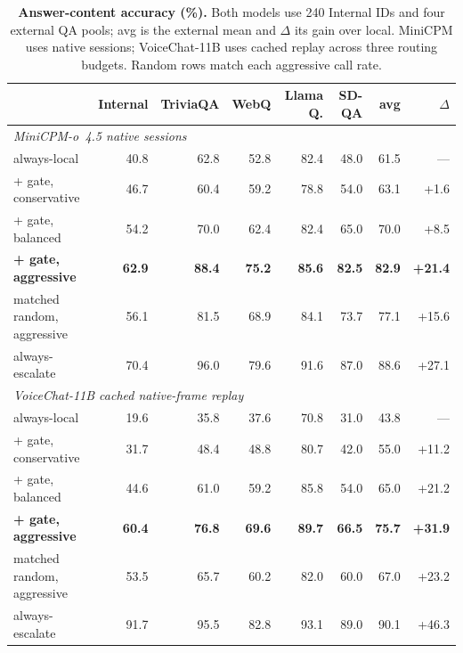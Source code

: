 \begin{table}[t]
\centering\small
\setlength{\tabcolsep}{3pt}
\renewcommand{\arraystretch}{0.98}
\caption{\textbf{Answer-content accuracy (\%).}
Both models use 240 Internal IDs and four external QA pools; avg is the
external mean and $\Delta$ its gain over local. MiniCPM uses native sessions;
VoiceChat-11B uses cached replay across three routing budgets. Random rows
match each aggressive call rate.}
\label{tab:transfer}
\begin{tabular*}{\linewidth}{@{\extracolsep{\fill}}lrrrrrrr@{}}
\toprule
& Internal & TriviaQA & WebQ & Llama Q. & SD-QA & avg & $\Delta$ \\
\midrule
\multicolumn{8}{l}{\emph{MiniCPM-o~4.5 native sessions}} \\
always-local & 40.8 & 62.8 & 52.8 & 82.4 & 48.0 & 61.5 & --- \\
\;+ gate, conservative & 46.7 & 60.4 & 59.2 & 78.8 & 54.0 & 63.1 & +1.6 \\
\;+ gate, balanced & 54.2 & 70.0 & 62.4 & 82.4 & 65.0 & 70.0 & +8.5 \\
\;\textbf{+ gate, aggressive} & \textbf{62.9} & \textbf{88.4} & \textbf{75.2} & \textbf{85.6} & \textbf{82.5} & \textbf{82.9} & \textbf{+21.4} \\
\;matched random, aggressive & 56.1 & 81.5 & 68.9 & 84.1 & 73.7 & 77.1 & +15.6 \\
always-escalate & 70.4 & 96.0 & 79.6 & 91.6 & 87.0 & 88.6 & +27.1 \\
\midrule
\multicolumn{8}{l}{\emph{VoiceChat-11B cached native-frame replay}} \\
always-local & 19.6 & 35.8 & 37.6 & 70.8 & 31.0 & 43.8 & --- \\
\;+ gate, conservative & 31.7 & 48.4 & 48.8 & 80.7 & 42.0 & 55.0 & +11.2 \\
\;+ gate, balanced & 44.6 & 61.0 & 59.2 & 85.8 & 54.0 & 65.0 & +21.2 \\
\;\textbf{+ gate, aggressive} & \textbf{60.4} & \textbf{76.8} & \textbf{69.6} & \textbf{89.7} & \textbf{66.5} & \textbf{75.7} & \textbf{+31.9} \\
\;matched random, aggressive & 53.5 & 65.7 & 60.2 & 82.0 & 60.0 & 67.0 & +23.2 \\
always-escalate & 91.7 & 95.5 & 82.8 & 93.1 & 89.0 & 90.1 & +46.3 \\
\bottomrule
\end{tabular*}
\end{table}
